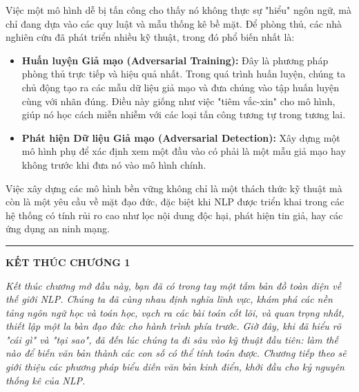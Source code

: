 Việc một mô hình dễ bị tấn công cho thấy nó không thực sự "hiểu" ngôn ngữ, mà chỉ đang dựa vào các quy luật và mẫu thống kê bề mặt. Để phòng thủ, các nhà nghiên cứu đã phát triển nhiều kỹ thuật, trong đó phổ biến nhất là:
\begin{itemize}
    \item \textbf{Huấn luyện Giả mạo (Adversarial Training):} Đây là phương pháp phòng thủ trực tiếp và hiệu quả nhất. Trong quá trình huấn luyện, chúng ta chủ động tạo ra các mẫu dữ liệu giả mạo và đưa chúng vào tập huấn luyện cùng với nhãn đúng. Điều này giống như việc "tiêm vắc-xin" cho mô hình, giúp nó học cách miễn nhiễm với các loại tấn công tương tự trong tương lai.
    \item \textbf{Phát hiện Dữ liệu Giả mạo (Adversarial Detection):} Xây dựng một mô hình phụ để xác định xem một đầu vào có phải là một mẫu giả mạo hay không trước khi đưa nó vào mô hình chính.
\end{itemize}

Việc xây dựng các mô hình bền vững không chỉ là một thách thức kỹ thuật mà còn là một yêu cầu về mặt đạo đức, đặc biệt khi NLP được triển khai trong các hệ thống có tính rủi ro cao như lọc nội dung độc hại, phát hiện tin giả, hay các ứng dụng an ninh mạng.

\bigskip
\hrule
\bigskip

\begin{center}
    \textbf{\Large KẾT THÚC CHƯƠNG 1}
\end{center}

\textit{Kết thúc chương mở đầu này, bạn đã có trong tay một tấm bản đồ toàn diện về thế giới NLP. Chúng ta đã cùng nhau định nghĩa lĩnh vực, khám phá các nền tảng ngôn ngữ học và toán học, vạch ra các bài toán cốt lõi, và quan trọng nhất, thiết lập một la bàn đạo đức cho hành trình phía trước. Giờ đây, khi đã hiểu rõ "cái gì" và "tại sao", đã đến lúc chúng ta đi sâu vào kỹ thuật đầu tiên: làm thế nào để biến văn bản thành các con số có thể tính toán được. Chương tiếp theo sẽ giới thiệu các phương pháp biểu diễn văn bản kinh điển, khởi đầu cho kỷ nguyên thống kê của NLP.}